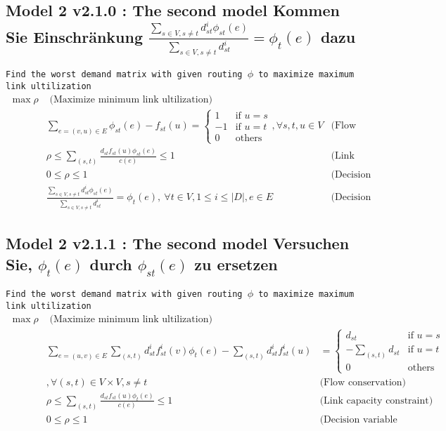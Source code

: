 \documentclass{ctexart}
\begin{document}
\subsection{Model 2 v2.1.0 : The second model Kommen Sie Einschränkung $\frac{\sum_{s\in V,s\not=t}d_{st}^i\phi_{st}(e)}{\sum_{s\in V,s\not=t}d_{st}^i}=\phi_t(e)$ dazu}
\texttt{Find the worst demand matrix with given routing $\phi$  to maximize maximum link ultilization} 
\begin{equation}
	\begin{aligned}
		\max \rho & \text{  (Maximize minimum link ultilization)}\\
		& \sum_{e=(v,u)\in E}\phi_{st}(e)-f_{st}(u)=\begin{cases}
			1 &\text{if } u=s \\
			-1 &\text{if } u=t \\
			0 &\text{others} 
		 \end{cases},\forall s,t,u\in V & \text{(Flow conservation)}\\
		& \rho\leq\sum_{(s,t)}\frac{
			d_{st}f_{st}(u)\phi_{st}(e)}{c(e)} \leq 1\ &  \text{(Link capacity constraint)} \\
		& 0\leq\rho\leq1\ & \text{(Decision variable constraint)}\\
		& \frac{\sum_{s\in V,s\not=t}d_{st}^i\phi_{st}(e)}{\sum_{s\in V,s\not=t}d_{st}^i}=\phi_t(e), \ \forall t\in V,1\leq i \leq |\textit{D}|, e\in E & \text{(Decision variable constraint)}
	\end{aligned}
\end{equation}

\subsection{Model 2 v2.1.1 : The second model Versuchen Sie, $\phi_t(e)$ durch $\phi_{st}(e)$ zu ersetzen}
\texttt{Find the worst demand matrix with given routing $\phi$  to maximize maximum link ultilization} 
\begin{equation}
	\begin{aligned}
		\max \rho & \text{  (Maximize minimum link ultilization)}\\
		& \sum_{e=(u,v)\in E}\sum_{(s,t)}d_{st}^if_{st}^i(v)\phi_{t}(e)-\sum_{(s,t)}d_{st}^if_{st}^i(u) & =\begin{cases}
			d_{st} &\text{if } u=s \\
			-\sum_{(s,t)}d_{st} &\text{if } u=t \\
			0 &\text{others} 
		 \end{cases}\\
		&, \forall (s,t)\in V\times V,s\not = t& \text{(Flow conservation)}\\
		& \rho\leq\sum_{(s,t)}\frac{
			d_{st}f_{st}(u)\phi_{t}(e)}{c(e)} \leq 1\ &  \text{(Link capacity constraint)} \\
		& 0\leq\rho\leq1& \text{(Decision variable constraint)}
	\end{aligned}
\end{equation}
\end{document}
